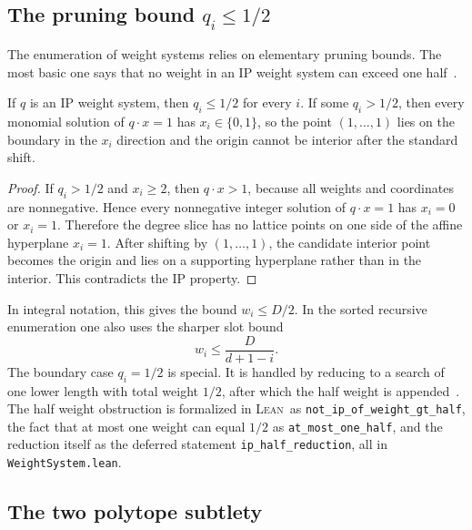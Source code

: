 \documentclass[appliedmath,article,submit,moreauthors]{Definitions/mdpi}
\newcommand{\Lean}{\textsc{Lean}}
\begin{document}
\subsection{The pruning bound \texorpdfstring{\(q_i\leq 1/2\)}{qi <= 1/2}}
\label{sec:math-half-bound}

The enumeration of weight systems relies on elementary pruning bounds. The most
basic one says that no weight in an IP weight system can exceed one
half~\cite{Skarke1996,Scholler2019}.

\begin{Proposition}
\label{prop:halfbound}
If \(q\) is an IP weight system, then \(q_i\leq 1/2\) for every \(i\). If some
\(q_i>1/2\), then every monomial solution of \(q\cdot x=1\) has
\(x_i\in\{0,1\}\), so the point \((1,\ldots,1)\) lies on the boundary in the
\(x_i\) direction and the origin cannot be interior after the standard shift.
\end{Proposition}

\begin{proof}
If \(q_i>1/2\) and \(x_i\geq 2\), then \(q\cdot x>1\), because all weights and
coordinates are nonnegative. Hence every nonnegative integer solution of
\(q\cdot x=1\) has \(x_i=0\) or \(x_i=1\). Therefore the degree slice has no
lattice points on one side of the affine hyperplane \(x_i=1\). After shifting by
\((1,\ldots,1)\), the candidate interior point becomes the origin and lies on a
supporting hyperplane rather than in the interior. This contradicts the IP
property.
\end{proof}

In integral notation, this gives the bound \(w_i\leq D/2\).  In the sorted
recursive enumeration one also uses the sharper slot bound
\[
        w_i\leq \frac{D}{d+1-i}.
\]
The boundary case \(q_i=1/2\) is special.  It is handled by reducing to a search
of one lower length with total weight \(1/2\), after which the half weight is
appended~\cite{Skarke1996,Scholler2019}.  The half weight obstruction is
formalized in \Lean\ as \nolinkurl{not\_ip\_of\_weight\_gt\_half}, the fact that
at most one weight can equal \(1/2\) as \nolinkurl{at\_most\_one\_half}, and the
reduction itself as the deferred statement \nolinkurl{ip\_half\_reduction}, all
in \nolinkurl{WeightSystem.lean}.

\subsection{The two polytope subtlety}
\label{sec:math-two-polytope}
\end{document}
